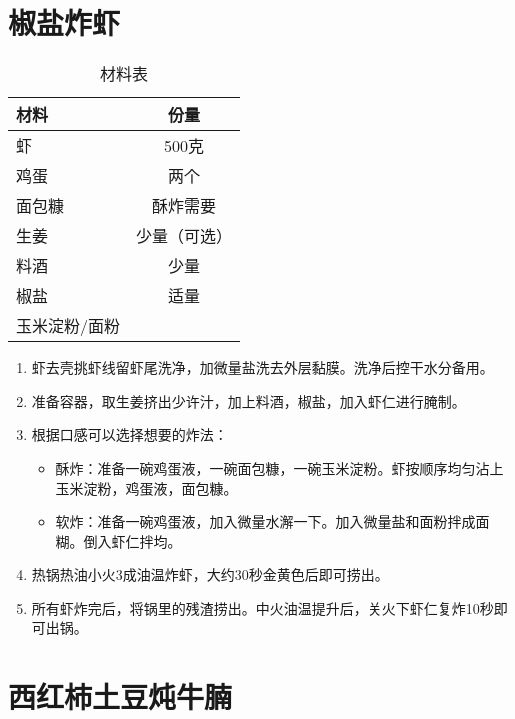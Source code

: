\section{椒盐炸虾}

\begin{table}[H]
    \centering
    \begin{tabular}{|l||c|}\hline
     \textbf{材料}    &  \textbf{份量}\\ \hline\hline
    虾    &  500克 \\ \hline
    鸡蛋    & 两个 \\ \hline
    面包糠 & 酥炸需要 \\ \hline
    生姜 & 少量（可选）\\ \hline
    料酒 &  少量 \\ \hline
    椒盐 & 适量 \\ \hline
    玉米淀粉/面粉  &  \\ \hline
    \end{tabular}
    \caption{材料表}
\end{table}

\begin{enumerate}
    \item 虾去壳挑虾线留虾尾洗净，加微量盐洗去外层黏膜。洗净后控干水分备用。
    \item 准备容器，取生姜挤出少许汁，加上料酒，椒盐，加入虾仁进行腌制。
    \item 根据口感可以选择想要的炸法：
    \begin{itemize}
        \item 酥炸：准备一碗鸡蛋液，一碗面包糠，一碗玉米淀粉。虾按顺序均匀沾上玉米淀粉，鸡蛋液，面包糠。
        \item 软炸：准备一碗鸡蛋液，加入微量水澥一下。加入微量盐和面粉拌成面糊。倒入虾仁拌均。
    \end{itemize}
    \item 热锅热油小火3成油温炸虾，大约30秒金黄色后即可捞出。
    \item 所有虾炸完后，将锅里的残渣捞出。中火油温提升后，关火下虾仁复炸10秒即可出锅。
\end{enumerate}



\section{西红柿土豆炖牛腩}

